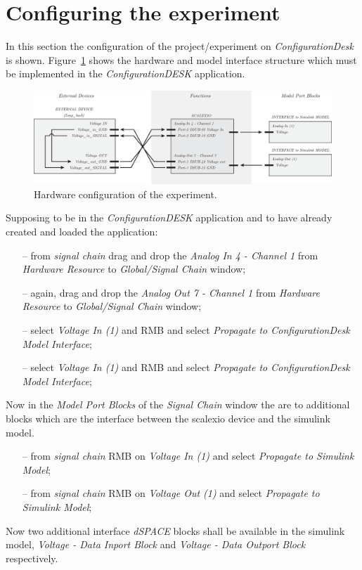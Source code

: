 \documentclass[11pt,a4paper,oneside]{book}
\numberwithin{equation}{section}
\theoremstyle{it}
\theoremstyle{definition}
\begin{document}
\section{Configuring the experiment}
In this section the configuration of the project/experiment on \textit{ConfigurationDesk} is shown. Figure~\ref{scalexio_fig_1} shows the hardware and model interface structure which must be implemented in the \textit{ConfigurationDESK} application.
\begin{figure}[H]
	\centering
	\includegraphics[width = 495pt, angle = 0, 
	keepaspectratio]{figures/scalexio/hardware_config_1.eps}
	\captionsetup{width=0.5\textwidth, font=small}
	\caption{Hardware configuration of the experiment.}
	\label{scalexio_fig_1}
\end{figure}
Supposing to be in the \textit{ConfigurationDESK} application and to have already created and loaded the application:
\begin{itemize}
	\item[--] from \textit{signal chain} drag and drop the \textit{Analog In 4 - Channel 1} from \textit{Hardware Resource} to \textit{Global/Signal Chain} window;
	\item[--] again, drag and drop the \textit{Analog Out 7 - Channel 1} from \textit{Hardware Resource} to \textit{Global/Signal Chain} window;
	\item[--] select \textit{Voltage In (1)} and RMB and select \textit{Propagate to ConfigurationDesk Model Interface};
	\item[--] select \textit{Voltage In (1)} and RMB and select \textit{Propagate to ConfigurationDesk Model Interface};
\end{itemize}
Now in the \textit{Model Port Blocks} of the \textit{Signal Chain} window the are to additional blocks which are the interface between the scalexio device and the simulink model.
\begin{itemize}
	\item[--] from \textit{signal chain} RMB on \textit{Voltage In (1)} and select \textit{Propagate to Simulink Model};
	\item[--] from \textit{signal chain} RMB on \textit{Voltage Out (1)} and select \textit{Propagate to Simulink Model};
\end{itemize}
Now two additional interface \textit{dSPACE} blocks shall be available in the simulink model, \textit{Voltage - Data Inport Block} and \textit{Voltage - Data Outport Block} respectively.
\end{document}
